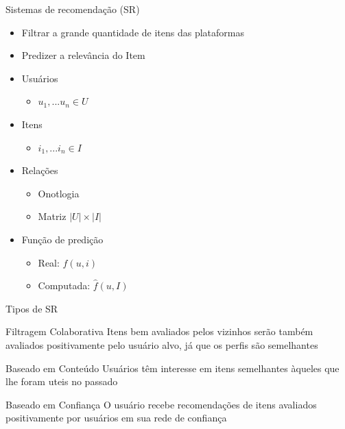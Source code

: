 \documentclass{beamer}
\begin{document}
\begin{frame}{Sistemas de recomendação (SR)}{}

  \begin{itemize}
    \item Filtrar a grande quantidade de itens das plataformas
    \item Predizer a relevância do Item
    
    \item Usuários
      \begin{itemize}
        \item $ u_1, ... u_n \in U $
      \end{itemize}

    \item Itens
      \begin{itemize}
        \item $ i_1, ... i_n \in I$
      \end{itemize}
    
    \item Relações
      \begin{itemize}
        \item Onotlogia
        \item Matriz $ |U| \times |I| $
      \end{itemize}
    
    \item Função de predição
      \begin{itemize}
        \item Real: $ f (u, i) $
        \item Computada: $\hat{f}(u, I)$
      \end{itemize}
  \end{itemize}
\end{frame}

\begin{frame}{Tipos de SR}{}
  \begin{block}{Filtragem Colaborativa}
    Itens bem avaliados pelos vizinhos serão também avaliados positivamente pelo usuário alvo, já que os perfis são semelhantes
  \end{block}
  \begin{block}{Baseado em Conteúdo}
    Usuários têm interesse em itens semelhantes àqueles que lhe foram uteis no passado
  \end{block}
  \begin{block}{Baseado em Confiança}
    O usuário recebe recomendações de itens avaliados positivamente por usuários em sua rede de confiança
  \end{block}
\end{frame}
\end{document}
